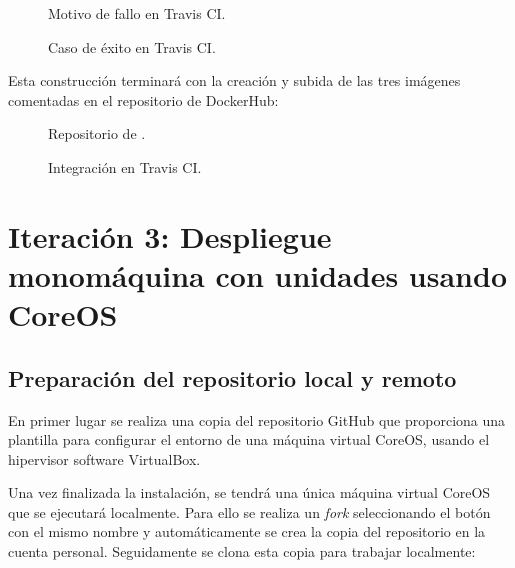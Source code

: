\begin{figure}[H]
\caption{Motivo de fallo en Travis CI.\label{fig:figure_placement_example}}
\end{figure}

\begin{figure}[H]
\caption{Caso de éxito en Travis CI.\label{fig:figure_placement_example}}
\end{figure}

Esta construcción terminará con la creación y subida de las tres imágenes comentadas en el repositorio de DockerHub:

\begin{figure}[H]
\caption{Repositorio de .\label{fig:figure_placement_example}}
\end{figure}


\begin{figure}[H]
\caption{Integración en Travis CI.\label{fig:figure_placement_example}}
\end{figure}

\section{Iteración 3: Despliegue monomáquina con unidades usando CoreOS}

\subsection{Preparación del repositorio local y remoto}

En primer lugar se realiza una copia del repositorio GitHub  que proporciona una plantilla  para configurar el entorno de una máquina virtual CoreOS, usando el hipervisor software VirtualBox. 

Una vez finalizada la instalación, se tendrá una única máquina virtual CoreOS que se ejecutará localmente. Para ello se realiza un \textit{fork} seleccionando el botón con el mismo nombre y automáticamente se crea la copia del repositorio en la cuenta personal. Seguidamente se clona esta copia para trabajar localmente:



